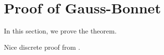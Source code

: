 \section{Proof of Gauss-Bonnet}
\label{sec:proof}


In this section, we prove the theorem.


Nice discrete proof from \cite{upadhyay2015}.
